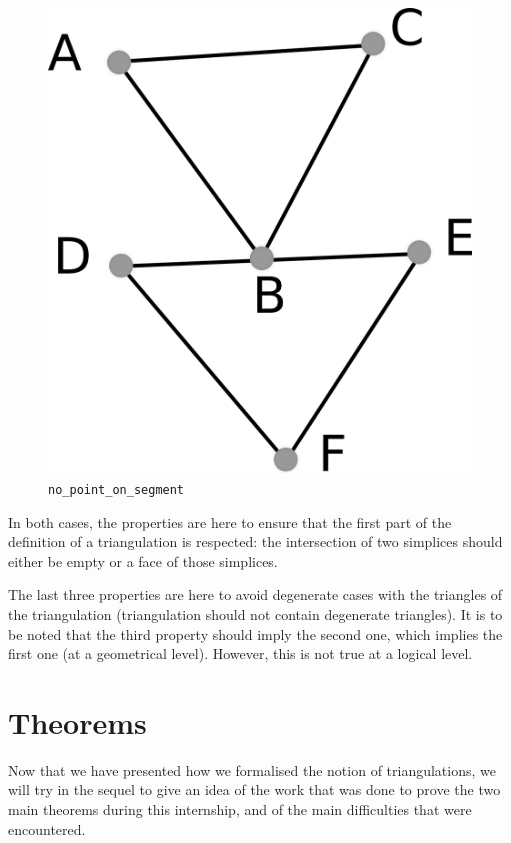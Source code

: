 \documentclass[a4paper,10pt]{article}
\begin{document}
\begin{enumerate}
\begin{figure}
\includegraphics[scale=2]{nps}
\caption{\label{nps} {\tt no\_point\_on\_segment}}
\end{figure}
\end{enumerate}
In both cases, the properties are here to ensure that the first part of the definition of a triangulation is respected: the intersection of two simplices should either be empty or a face of those simplices.

The last three properties are here to avoid degenerate cases with the triangles of the triangulation (triangulation should not contain degenerate triangles). It is to be noted that the third property should imply the second one, which implies the first one (at a geometrical level). However, this is not true at a logical level.




\section{Theorems}
\label{theorems}
Now that we have presented how we formalised the notion of triangulations, we will try in the sequel to give an idea of the work that was done to prove the two main theorems during this internship, and of the main difficulties that were encountered.
\end{document}
